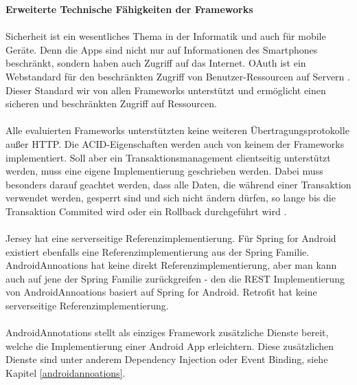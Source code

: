 {\large \textbf{Erweiterte Technische Fähigkeiten der Frameworks}}\\\\
Sicherheit ist ein wesentliches Thema in der Informatik und auch für mobile Geräte. Denn die Apps sind nicht nur auf Informationen des Smartphones beschränkt, sondern haben auch Zugriff auf das Internet. OAuth ist ein Webstandard für den beschränkten Zugriff von Benutzer-Ressourcen auf Servern \cite{shehab:secure}. Dieser Standard wir von allen Frameworks unterstützt und ermöglicht einen sicheren und beschränkten Zugriff auf Ressourcen. 
\\\\
Alle evaluierten Frameworks unterstützten keine weiteren Übertragungsprotokolle außer HTTP. Die ACID-Eigenschaften werden auch von keinem der Frameworks implementiert. Soll aber ein Transaktionsmanagement clientseitig unterstützt werden, muss eine eigene Implementierung geschrieben werden. Dabei muss besonders darauf geachtet werden, dass alle Daten, die während einer Transaktion verwendet werden, gesperrt sind und sich nicht ändern dürfen, so lange bis die Transaktion Commited wird oder ein Rollback durchgeführt wird \cite{braun:Transaktionen}.
\\\\
Jersey hat eine serverseitige Referenzimplementierung. Für Spring for Android existiert ebenfalls eine Referenzimplementierung aus der Spring Familie. AndroidAnnoations hat keine direkt Referenzimplementierung, aber man kann auch auf jene der Spring Familie zurückgreifen - den die REST Implementierung von AndroidAnnoations basiert auf Spring for Android. Retrofit hat keine serverseitige Referenzimplementierung.
\\\\
AndroidAnnotations stellt als einziges Framework zusätzliche Dienste bereit, welche die Implementierung einer Android App erleichtern. Diese zusätzlichen Dienste sind unter anderem Dependency Injection oder Event Binding, siehe Kapitel \ref{androidannoations}.
  
